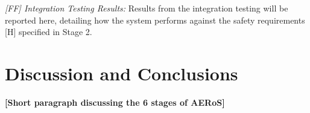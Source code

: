 \documentclass[runningheads]{llncs}
\begin{document}
\emph{[FF] Integration Testing Results:} Results from the integration testing will be reported here, detailing how the system performs against the safety requirements [H] specified in Stage 2.


\section{Discussion and Conclusions} \label{discussion-conclusions}
\noindent \textbf{[Short paragraph discussing the 6 stages of AERoS]}
\end{document}
